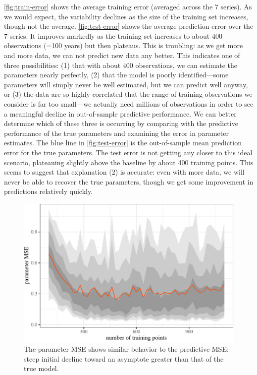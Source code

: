 \documentclass[11pt]{article}
\begin{document}
\autoref{fig:train-error} shows the average training error (averaged
across the 7 series). As we would expect, the variability declines as
the size of the training set increases, though not the average.
\autoref{fig:test-error} shows the average prediction error over the 7
series. It improves markedly as the training set increases to about 400
observations (=100 years) but then plateaus. This is troubling: as we
get more and more data, we can not predict new data any better. This
indicates one of three possibilities: (1) that with about 400
observations, we can estimate the parameters nearly perfectly, (2) that
the model is poorly identified---some parameters will simply never be
well estimated, but we can predict well anyway, or (3) the data are so
highly correlated that the range of training observations we consider is
far too small---we actually need millions of observations in order to
see a meaningful decline in out-of-sample predictive performance. We can
better determine which of these three is occurring by comparing with the
predictive performance of the true parameters and examining the error in
parameter estimates. The blue line in \autoref{fig:test-error} is the
out-of-sample mean prediction error for the true parameters. The test
error is not getting any closer to this ideal scenario, plateauing
slightly above the baseline by about 400 training points. This seems to
suggest that explanation (2) is accurate: even with more data, we will
never be able to recover the true parameters, though we get some
improvement in predictions relatively quickly.

\begin{figure}[t]

{\centering \includegraphics{gfx/parm-error-1} 

}

\caption{The parameter MSE shows similar behavior to the predictive MSE: steep initial decline toward an asymptote greater than that of the true model.}\label{fig:parm-error}
\end{figure}
\end{document}
